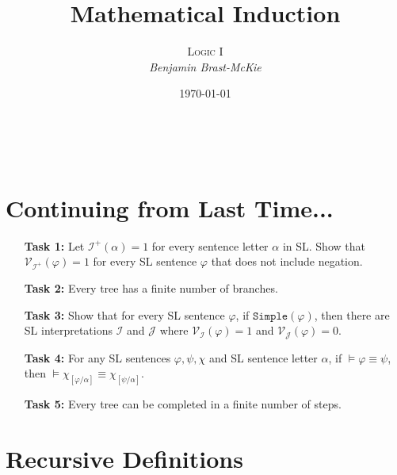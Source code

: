 \documentclass[a4paper, 11pt]{article} %
\title{\textbf{Mathematical Induction}} %
\author{\textsc{Logic I}\\ \em Benjamin Brast-McKie} %
\date{\today} %
\makeatletter
\newcommand{\I}{\mathcal{I}}
\newcommand{\J}{\mathcal{J}}
\newcommand{\simp}{\texttt{Simple}}
\newcommand{\V}[1]{\mathcal{V}_{#1}} %
\renewcommand{\maketitle}{ %
\begin{flushright} %
{\LARGE\@title} %

\vspace{10pt} %

{\@author} %
\\\@date %

\vspace{20pt} %
\end{flushright}
}
\makeatother
\begin{document}
\maketitle %

\thispagestyle{empty}


\section*{Continuing from Last Time...}

\begin{enumerate}
  \item[\bf Task 1:] Let $\I^+(\alpha)=1$ for every sentence letter $\alpha$ in SL. Show that $\V{\I^+}(\varphi)=1$ for every SL sentence $\varphi$ that does not include negation. 
  \item[\bf Task 2:] Every tree has a finite number of branches.
  \item[\bf Task 3:] Show that for every SL sentence $\varphi$, if $\simp(\varphi)$, then there are SL interpretations $\I$ and $\J$ where $\V{\I}(\varphi)=1$ and $\V{\J}(\varphi)=0$. 
  \item[\bf Task 4:] For any SL sentences $\varphi,\psi,\chi$ and SL sentence letter $\alpha$, if $\vDash \varphi \equiv \psi$, then $\vDash \chi_{[\varphi/\alpha]}\equiv\chi_{[\psi/\alpha]}$.
  \item[\bf Task 5:] Every tree can be completed in a finite number of steps.
\end{enumerate}




\section*{Recursive Definitions}
\end{document}

